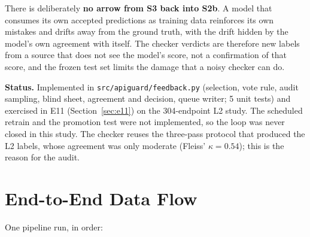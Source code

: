 \documentclass[conference]{IEEEtran}
\begin{document}
There is deliberately \textbf{no arrow from S3 back into S2b}. A model that consumes its own
accepted predictions as training data reinforces its own mistakes and drifts away from the
ground truth, with the drift hidden by the model's own agreement with itself. The checker
verdicts are therefore new labels from a source that does not see the model's score, not a
confirmation of that score, and the frozen test set limits the damage that a noisy checker
can do.

\textbf{Status.} Implemented in \texttt{src/apiguard/feedback.py} (selection, vote rule, audit sampling, blind sheet, agreement and decision, queue writer;
5 unit tests) and exercised in E11 (Section~\ref{sec:e11}) on the 304-endpoint L2 study. The scheduled retrain and the promotion test were not implemented,
so the loop was never closed in this study. The checker reuses the three-pass protocol that produced the L2 labels, whose agreement was only moderate
(Fleiss' $\kappa=0.54$); this is the reason for the audit.

\section{End-to-End Data Flow}
One pipeline run, in order:
\end{document}

